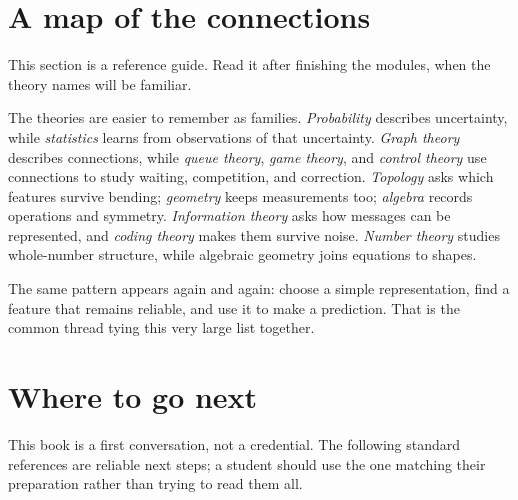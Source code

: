 \documentclass[11pt,oneside]{book}
\begin{document}
\chapter*{A map of the connections}
This section is a reference guide. Read it after finishing the modules, when the theory names will be familiar.

The theories are easier to remember as families. \emph{Probability} describes uncertainty, while \emph{statistics} learns from observations of that uncertainty. \emph{Graph theory} describes connections, while \emph{queue theory}, \emph{game theory}, and \emph{control theory} use connections to study waiting, competition, and correction. \emph{Topology} asks which features survive bending; \emph{geometry} keeps measurements too; \emph{algebra} records operations and symmetry. \emph{Information theory} asks how messages can be represented, and \emph{coding theory} makes them survive noise. \emph{Number theory} studies whole-number structure, while algebraic geometry joins equations to shapes.

The same pattern appears again and again: choose a simple representation, find a feature that remains reliable, and use it to make a prediction. That is the common thread tying this very large list together.

\chapter*{Where to go next}
This book is a first conversation, not a credential. The following standard references are reliable next steps; a student should use the one matching their preparation rather than trying to read them all.
\end{document}
